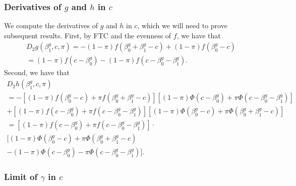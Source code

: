 \documentclass[12pt]{article}
\begin{document}
\subsubsection{Derivatives of  $g$ and $h$ in $c$}\label{sec:derivatives}
We compute the derivatives of $g$ and $h$ in $c$, which we will need to prove subsequent results. First, by FTC and the evenness of $f$, we have that
\begin{multline}\label{dg_dc}
D_2 g(\beta^g_1, c, \pi) = -(1-\pi)f( \beta^g_0 + \beta^g_1 - c ) + (1-\pi) f(\beta^g_0 - c) \\ = (1-\pi) f(c - \beta^g_0) - (1-\pi)f(c - \beta^g_0 - \beta^g_1).
\end{multline}
Second, we have that
\begin{multline}\label{dh_dc}
D_2 h(\beta^g_1, c, \pi) \\ = -[(1-\pi)f(\beta^g_0 - c) + \pi f( \beta^g_0 + \beta^g_1 - c )]\left[(1-\pi)\Phi(c - \beta^g_0) + \pi \Phi(c - \beta_0^g - \beta_1^g)  \right] \\ + [(1-\pi) f(c - \beta^g_0) +  \pi f(c - \beta^g_0 - \beta^g_1)] \left[(1-\pi) \Phi(\beta_0^g - c) + \pi \Phi(\beta^g_0 + \beta^g_1 - c) \right] \\ = \left[ (1-\pi) f(c - \beta^g_0) +  \pi f(c - \beta^g_0 - \beta^g_1) \right] \cdot \\ \bigg[ (1-\pi) \Phi(\beta_0^g - c) + \pi\Phi(\beta^g_0 + \beta^g_1 - c) \\ - (1-\pi) \Phi(c - \beta^g_0) - \pi \Phi(c - \beta_0^g - \beta_1^g) \bigg].
\end{multline}

\subsubsection{Limit of $\gamma$ in $c$}\label{sec:c_limit}
\end{document}
